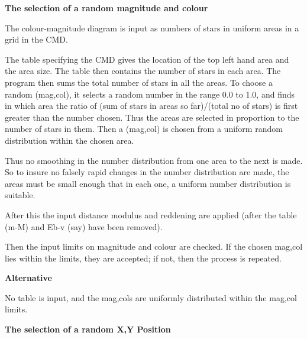 {{  {\bf The selection of a random magnitude and colour}
                                                                               
  The colour-magnitude diagram is input as numbers of stars in uniform
  areas in a grid in the CMD.
                                                                               
  The table specifying the CMD gives the location of the top left hand
  area and the area size. The table then contains the number of stars
  in each area. The program then sums the total number of stars in all
  the areas. To choose a random (mag,col), it selects a random number in
  the range 0.0 to 1.0, and finds in which area the ratio of
  (sum of stars in areas so far)/(total no of stars) is first greater
  than the number chosen. Thus the areas are selected in proportion to
  the number of stars in them. Then a (mag,col) is chosen from a uniform
  random distribution within the chosen area.
                                                                               
  Thus no smoothing in the number distribution from one area to the
  next is made. So to insure no falsely rapid changes in the number
  distribution are made, the areas must be small enough that in each
  one, a uniform number distribution is suitable.
                                                                               
  After this the input distance modulus and reddening are applied (after
  the table (m-M) and Eb-v (say) have been removed).
                                                                               
  Then the input limits on magnitude and colour are checked. If the
  chosen mag,col lies within the limits, they are accepted; if not,
  then the process is repeated.
                                                                               
  {\bf Alternative}
                                                                               
  No table is input, and the mag,cols are uniformly distributed within
  the mag,col limits.
                                                                               
                                                                               
  {\bf The selection of a random X,Y Position}
                                                                               
}}
